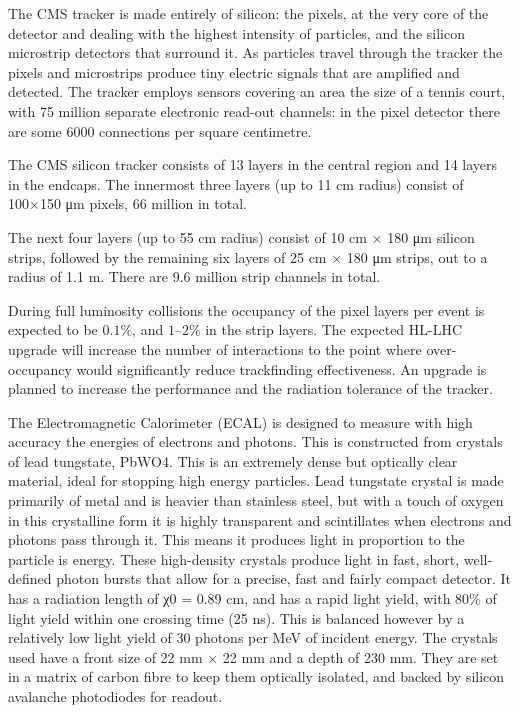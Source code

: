 The CMS tracker is made entirely of silicon: the pixels, at the very core of the detector and dealing with the highest intensity of particles, and the silicon microstrip detectors that surround it. As particles travel through the tracker the pixels and microstrips produce tiny electric signals that are amplified and detected. The tracker employs sensors covering an area the size of a tennis court, with 75 million separate electronic read-out channels: in the pixel detector there are some 6000 connections per square centimetre.

The CMS silicon tracker consists of 13 layers in the central region and 14 layers in the endcaps. The innermost three layers (up to 11 cm radius) consist of 100×150 μm pixels, 66 million in total.

The next four layers (up to 55 cm radius) consist of 10 cm × 180 μm silicon strips, followed by the remaining six layers of 25 cm × 180 μm strips, out to a radius of 1.1 m. There are 9.6 million strip channels in total.

During full luminosity collisions the occupancy of the pixel layers per event is expected to be $0.1\%$, and $1–2\%$ in the strip layers. The expected HL-LHC upgrade will increase the number of interactions to the point where over-occupancy would significantly reduce trackfinding effectiveness. An upgrade is planned to increase the performance and the radiation tolerance of the tracker.

The Electromagnetic Calorimeter (ECAL) is designed to measure with high accuracy the energies of electrons and photons. This is constructed from crystals of lead tungstate, PbWO4. This is an extremely dense but optically clear material, ideal for stopping high energy particles. Lead tungstate crystal is made primarily of metal and is heavier than stainless steel, but with a touch of oxygen in this crystalline form it is highly transparent and scintillates when electrons and photons pass through it. This means it produces light in proportion to the particle is energy. These high-density crystals produce light in fast, short, well-defined photon bursts that allow for a precise, fast and fairly compact detector. It has a radiation length of χ0 = 0.89 cm, and has a rapid light yield, with $80\%$ of light yield within one crossing time (25 ns). This is balanced however by a relatively low light yield of 30 photons per MeV of incident energy. The crystals used have a front size of 22 mm × 22 mm and a depth of 230 mm. They are set in a matrix of carbon fibre to keep them optically isolated, and backed by silicon avalanche photodiodes for readout.

